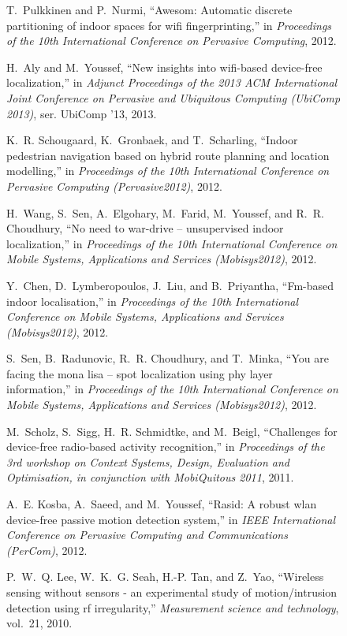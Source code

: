\documentclass[journal]{IEEEtran}
\begin{document}
\begin{figure*}
\begin{thebibliography}{100}
T.~Pulkkinen and P.~Nurmi, ``Awesom: Automatic discrete partitioning of indoor
  spaces for wifi fingerprinting,'' in \emph{Proceedings of the 10th
  International Conference on Pervasive Computing}, 2012.

H.~Aly and M.~Youssef, ``New insights into wifi-based device-free
  localization,'' in \emph{Adjunct Proceedings of the 2013 ACM International
  Joint Conference on Pervasive and Ubiquitous Computing (UbiComp 2013)}, ser.
  UbiComp '13, 2013.

K.~R. Schougaard, K.~Gronbaek, and T.~Scharling, ``Indoor pedestrian navigation
  based on hybrid route planning and location modelling,'' in \emph{Proceedings
  of the 10th International Conference on Pervasive Computing (Pervasive2012)},
  2012.

H.~Wang, S.~Sen, A.~Elgohary, M.~Farid, M.~Youssef, and R.~R. Choudhury, ``No
  need to war-drive -- unsupervised indoor localization,'' in \emph{Proceedings
  of the 10th International Conference on Mobile Systems, Applications and
  Services (Mobisys2012)}, 2012.

Y.~Chen, D.~Lymberopoulos, J.~Liu, and B.~Priyantha, ``Fm-based indoor
  localisation,'' in \emph{Proceedings of the 10th International Conference on
  Mobile Systems, Applications and Services (Mobisys2012)}, 2012.

S.~Sen, B.~Radunovic, R.~R. Choudhury, and T.~Minka, ``You are facing the mona
  lisa -- spot localization using phy layer information,'' in \emph{Proceedings
  of the 10th International Conference on Mobile Systems, Applications and
  Services (Mobisys2012)}, 2012.

M.~Scholz, S.~Sigg, H.~R. Schmidtke, and M.~Beigl, ``Challenges for device-free
  radio-based activity recognition,'' in \emph{Proceedings of the 3rd workshop
  on Context Systems, Design, Evaluation and Optimisation, in conjunction with
  MobiQuitous 2011}, 2011.

A.~E. Kosba, A.~Saeed, and M.~Youssef, ``Rasid: A robust wlan device-free
  passive motion detection system,'' in \emph{IEEE International Conference on
  Pervasive Computing and Communications (PerCom)}, 2012.

P.~W.~Q. Lee, W.~K.~G. Seah, H.-P. Tan, and Z.~Yao, ``Wireless sensing without
  sensors - an experimental study of motion/intrusion detection using rf
  irregularity,'' \emph{Measurement science and technology}, vol.~21, 2010.


\end{thebibliography}
\end{figure*}
\end{document}
